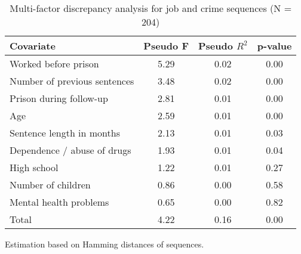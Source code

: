\begin{table}[htp]
\footnotesize
\setlength{\tabcolsep}{10pt}
\renewcommand{\arraystretch}{1.3}
\begin{threeparttable}
\centering
\caption{Multi-factor discrepancy analysis for job and crime sequences (N = 204)} 
\label{tab:discrepancy_crime_job}
\begin{tabular}{lccc}
  \hline
Covariate & Pseudo F & Pseudo $R^2$ & p-value \\ 
  \hline
Worked before prison & 5.29 & 0.02 & 0.00 \\ 
  Number of previous sentences & 3.48 & 0.02 & 0.00 \\ 
  Prison during follow-up & 2.81 & 0.01 & 0.00 \\ 
  Age & 2.59 & 0.01 & 0.00 \\ 
  Sentence length in months & 2.13 & 0.01 & 0.03 \\ 
  Dependence / abuse of drugs & 1.93 & 0.01 & 0.04 \\ 
  High school & 1.22 & 0.01 & 0.27 \\ 
  Number of children & 0.86 & 0.00 & 0.58 \\ 
  Mental health problems & 0.65 & 0.00 & 0.82 \\ 
  Total & 4.22 & 0.16 & 0.00 \\ 
   \hline
\end{tabular}
\begin{tablenotes}
\scriptsize
\item Estimation based on Hamming distances of sequences.
\end{tablenotes}
\end{threeparttable}
\end{table}
